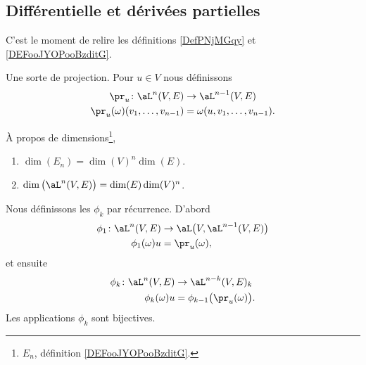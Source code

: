 \subsection{Différentielle et dérivées partielles}

C'est le moment de relire les définitions \ref{DefPNjMGqy} et \ref{DEFooJYOPooBzditG}.

\begin{definition}
	Une sorte de projection. Pour \( u\in V\) nous définissons
	\begin{equation}
		\begin{aligned}
			\pr_u\colon \aL^n(V,E)             & \to \aL^{n-1}(V,E)              \\
			\pr_u(\omega)(v_1,\ldots, v_{n-1}) & =\omega(u,v_1,\ldots, v_{n-1}).
		\end{aligned}
	\end{equation}
\end{definition}

\begin{lemma}      \label{LEMooSMZQooJBVySP}
	À propos de dimensions\footnote{\( E_n\), définition \ref{DEFooJYOPooBzditG}.},
	\begin{enumerate}
		\item       \label{ITEMooUWEBooSzFseN}
		      \( \dim(E_n)=\dim(V)^n\dim(E)\).
		\item       \label{ITEMooFMKQooFSMpgF}
		      \( \dim\big( \aL^n(V,E) \big)=\dim(E)\dim(V)^n\).
	\end{enumerate}
\end{lemma}

\begin{lemma}        \label{LEMooTDLNooTcPkLg}
	Nous définissons les \( \phi_k\) par récurrence. D'abord
	\begin{equation}
		\begin{aligned}
			\phi_1\colon \aL^n(V,E) & \to \aL\big( V,\aL^{n-1}(V,E) \big) \\
			\phi_1(\omega)u         & =\pr_u(\omega),
		\end{aligned}
	\end{equation}
	et ensuite
	\begin{equation}
		\begin{aligned}
			\phi_k\colon \aL^n(V,E) & \to \aL^{n-k}(V,E)_{k}                \\
			\phi_k(\omega)u         & =\phi_{k-1}\big( \pr_u(\omega) \big).
		\end{aligned}
	\end{equation}
	Les applications \( \phi_k\) sont bijectives.
\end{lemma}

